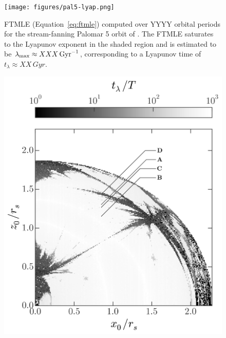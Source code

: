 \documentclass[letterpaper,12pt,preprint]{aastex}
\begin{document}
\begin{figure}[p]
\begin{center}
\texttt{[image: figures/pal5-lyap.png]}
\caption{ FTMLE (Equation~\ref{eq:ftmle}) computed over YYYY orbital periods for the stream-fanning Palomar 5 orbit of \cite{pearson15}. The FTMLE saturates to the Lyapunov exponent in the shaded region and is estimated to be $\lambda_{\rm max} \approx XXX \, {\rm Gyr}^{-1}$, corresponding to a Lyapunov time of $t_\lambda \approx XX \, {Gyr}$. } \label{fig:pal5}
\end{center}
\end{figure}

\begin{figure}[p]
\begin{center}
\includegraphics[width=\textwidth]{figures/lyap_map.png}
\caption{  } \label{fig:lyapmap} 
\end{center}
\end{figure}
\end{document}
